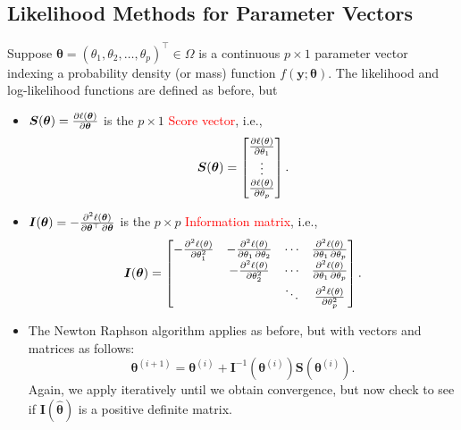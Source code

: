 \documentclass{article}\usepackage[]{graphicx}\usepackage[svgnames]{xcolor}
\providecommand{\Vector}[1]{\bm{#1}}%
\providecommand{\Matrix}[1]{\bm{#1}}
\begin{document}
\subsection*{Likelihood Methods for Parameter Vectors}
Suppose $ \Vector{\theta}=(\theta_1,\theta_2,\ldots,\theta_p)^\top\in \Omega $ is a continuous $ p\times 1 $ parameter vector
indexing a probability density (or mass) function $ f(\Vector{y};\Vector{\theta}) $. The likelihood and
log-likelihood functions are defined as before, but
\begin{itemize}
      \item $ \Vector{S}(\Vector{\theta})=\pdv{\ell( \Vector{\theta})}{ \Vector{\theta}} $ is the $ p\times 1 $ \textcolor{Red}{Score vector}, i.e.,
            \[ \Vector{S}(\Vector{\theta})=\begin{bmatrix}
                        \pdv{\ell(\theta)}{\theta_1} \\
                        \vdots                       \\
                        \pdv{\ell(\theta)}{\theta_p}
                  \end{bmatrix}. \]
      \item $ \Matrix{I}(\Vector{\theta})=-\pdv{\ell(\Vector{\theta})}{ \Vector{\theta}^\top,\Vector{\theta}} $ is the $ p\times p $ \textcolor{Red}{Information matrix}, i.e.,
            \[ \Matrix{I}(\Vector{\theta})=\begin{bmatrix}
                        -\pdv[order=2]{\ell(\theta)}{\theta_1} & -\pdv{\ell(\theta)}{\theta_1,\theta_2} & \cdots & \pdv{\ell(\theta)}{\theta_1,\theta_p} \\
                                                               & -\pdv[order=2]{\ell(\theta)}{\theta_2} & \cdots & \pdv{\ell(\theta)}{\theta_1,\theta_p} \\
                                                               &                                        & \ddots & \pdv[order=2]{\ell(\theta)}{\theta_p}
                  \end{bmatrix}. \]

\end{itemize}
\begin{itemize}
      \item The Newton Raphson algorithm applies as before, but with vectors and matrices
            as follows:
            \[ \Vector{\theta}^{(i+1)}=\Vector{\theta}^{(i)}+\Matrix{I}^{-1}(\Vector{\theta}^{(i)})\Vector{S}(\Vector{\theta}^{(i)}). \]
            Again, we apply iteratively until we obtain convergence, but now check to
            see if $ \Matrix{I}(\hat{\Vector{\theta}}) $ is a positive definite matrix.
\end{itemize}
\end{document}
